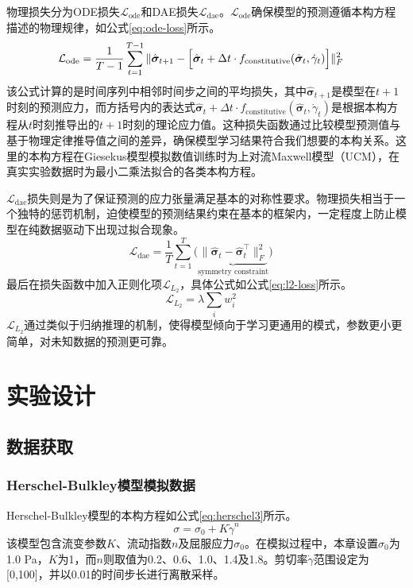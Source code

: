 物理损失分为ODE损失$\mathcal{L}_{\text{ode}}$和DAE损失$\mathcal{L}_{\text{dae}}$。$\mathcal{L}_{\text{ode}}$确保模型的预测遵循本构方程描述的物理规律，如公式\ref{eq:ode-loss}所示。
\begin{equation}
  \mathcal{L}_{\text{ode}} = \frac{1}{T-1} \sum_{t=1}^{T-1}
  \|\hat{\bm{\sigma}}_{t+1} - \Bigl[
    \hat{\bm{\sigma}}_t + \Delta t \cdot
    f_{\text{constitutive}}(\hat{\bm{\sigma}}_t, \dot{\gamma}_t)
    \Bigr] \|_F^2
  \quad \label{eq:ode-loss}
\end{equation}
该公式计算的是时间序列中相邻时间步之间的平均损失，其中$\hat{\bm{\sigma}}_{t+1}$是模型在$t+1$时刻的预测应力，而方括号内的表达式$\hat{\bm{\sigma}}_t + \Delta t \cdot f_{\text{constitutive}}(\hat{\bm{\sigma}}_t, \dot{\gamma}_t)$是根据本构方程从$t$时刻推导出的$t+1$时刻的理论应力值。这种损失函数通过比较模型预测值与基于物理定律推导值之间的差异，确保模型学习结果符合我们想要的本构关系。这里的本构方程在Giesekus模型模拟数值训练时为上对流Maxwell模型（UCM），在真实实验数据时为最小二乘法拟合的各类本构方程。

$\mathcal{L}_{\text{dae}}$损失则是为了保证预测的应力张量满足基本的对称性要求。物理损失相当于一个独特的惩罚机制，迫使模型的预测结果约束在基本的框架内，一定程度上防止模型在纯数据驱动下出现过拟合现象。
\begin{equation}
  \mathcal{L}_{\text{dae}} = \frac{1}{T} \sum_{t=1}^T \Biggl(
  \underbrace{\|\hat{\bm{\sigma}}_t - \hat{\bm{\sigma}}_t^\top\|_F^2}_{\text{symmetry constraint}}
  \Biggr)
  \quad \label{eq:dae-loss}
\end{equation}
最后在损失函数中加入正则化项$\mathcal{L}_{L_{2}}$，具体公式如公式\ref{eq:l2-loss}所示。
\begin{equation}
  \mathcal{L}_{L_{2}} = \lambda \sum_{i} w_i^2
  \quad \label{eq:l2-loss}
\end{equation}
$\mathcal{L}_{L_{2}}$通过类似于归纳推理的机制，使得模型倾向于学习更通用的模式，参数更小更简单，对未知数据的预测更可靠。

\section{实验设计}
\subsection{数据获取}
\subsubsection{Herschel-Bulkley模型模拟数据}
Herschel-Bulkley模型的本构方程如公式\eqref{eq:herschel3}所示。
\begin{equation}
  \sigma=\sigma_0+K\dot{\gamma}^n \label{eq:herschel3}
\end{equation}
该模型包含流变参数$K$、流动指数$n$及屈服应力$\sigma_0$。在模拟过程中，本章设置$\sigma_0$为1.0 Pa，$K$为1，而$n$则取值为0.2、0.6、1.0、1.4及1.8。剪切率$\dot{\gamma}$范围设定为[0,100]，并以0.01的时间步长进行离散采样。

